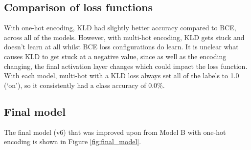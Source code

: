 \documentclass[12pt]{article}
\begin{document}
	\subsection{Comparison of loss functions}
	
	With one-hot encoding, KLD had slightly better accuracy compared to BCE, across all of the models. However, with multi-hot encoding, KLD gets stuck and doesn't learn at all whilst BCE loss configurations do learn. It is unclear what causes KLD to get stuck at a negative value, since as well as the encoding changing, the final activation layer changes which could impact the loss function. With each model, multi-hot with a KLD loss always set all of the labels to 1.0 (`on'), so it consistently had a class accuracy of 0.0\%.\medskip
	
	\subsection{Final model}
	
	The final model (v6) that was improved upon from Model B with one-hot encoding is shown in Figure \ref{fig:final_model}.
	
\end{document}
